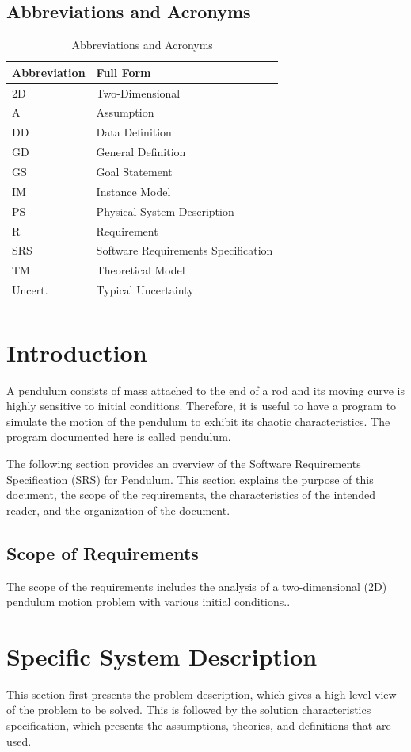 \documentclass[12pt]{article}
\begin{document}
\subsection{Abbreviations and Acronyms}
\label{Sec:TAbbAcc}
\begin{longtable}{l l}
\toprule
\textbf{Abbreviation} & \textbf{Full Form}
\\
\midrule
\endhead
2D & Two-Dimensional
\\
A & Assumption
\\
DD & Data Definition
\\
GD & General Definition
\\
GS & Goal Statement
\\
IM & Instance Model
\\
PS & Physical System Description
\\
R & Requirement
\\
SRS & Software Requirements Specification
\\
TM & Theoretical Model
\\
Uncert. & Typical Uncertainty
\\
\bottomrule
\caption{Abbreviations and Acronyms}
\label{Table:TAbbAcc}
\end{longtable}
\section{Introduction}
\label{Sec:Intro}
A pendulum consists of mass attached to the end of a rod and its moving curve is highly sensitive to initial conditions. Therefore, it is useful to have a program to simulate the motion of the pendulum to exhibit its chaotic characteristics. The program documented here is called pendulum.

The following section provides an overview of the Software Requirements Specification (SRS) for Pendulum. This section explains the purpose of this document, the scope of the requirements, the characteristics of the intended reader, and the organization of the document.

\subsection{Scope of Requirements}
\label{Sec:ReqsScope}
The scope of the requirements includes the analysis of a two-dimensional (2D) pendulum motion problem with various initial conditions..

\section{Specific System Description}
\label{Sec:SpecSystDesc}
This section first presents the problem description, which gives a high-level view of the problem to be solved. This is followed by the solution characteristics specification, which presents the assumptions, theories, and definitions that are used.
\end{document}
